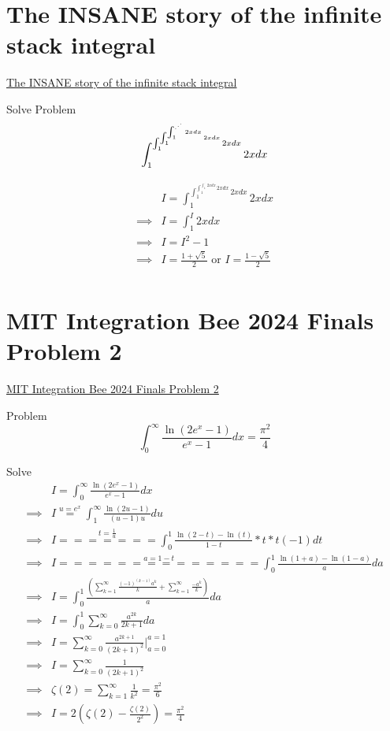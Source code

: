 \documentclass {article}
\begin{document}
\section{The INSANE story of the infinite stack integral}
\href{https://www.youtube.com/watch?v=R1ssF4iS3mk}{The INSANE story of the infinite stack integral}

Solve Problem
\[
\int_1^{\int_1^{\int_1^{\int_1^{.^{.^{.}}} 2x {d}x}2x {d}x}2x {d}x}2x {d}x \\
\]

\[
\begin{matrix}
 &    I = \int_1^{\int_1^{\int_1^{\int_1^{.^{.^{.}}} 2x {d}x}2x {d}x}2x {d}x}2x {d}x \\
 \implies & I = \int_1^{I} 2x{d}x \\
 \implies & I = I ^2 - 1 \\
 \implies & I = \frac {1 + \sqrt{5}} {2} \text { or } I = \frac {1 - \sqrt{5}} {2}  \\
\end{matrix}
\]

\section{MIT Integration Bee 2024 Finals Problem 2}
\href{https://www.youtube.com/watch?v=xdpKnkm2MT0}{MIT Integration Bee 2024 Finals Problem 2}



Problem  \[ \int_0^{\infty} \frac {\ln\left(2e^{x} - 1\right)} {e ^ {x} - 1} {d}x = \frac{\pi^2} {4}\]

Solve
\[
\begin{matrix}
        & I = \int_0^{\infty} \frac{\ln\left(2e^{x} - 1\right)} {e^{x}-1}{d}x \\
\implies & I \stackrel{u=e^{x}}{=} \int_1^{\infty} \frac{\ln\left(2u - 1\right)}{(u - 1)u} {d}u   \\
\implies & I \stackrel{t = \frac{1}{u}}{=======} \int_0^{1} \frac{\ln(2-t) - \ln(t)}{1-t} * t * t (-1) {d}t \\
\implies & I \stackrel {a = 1-t} {==============} \int_0^{1} \frac{\ln(1+a) - \ln(1-a)} {a} {d}a  \\
\implies & I = \int_0^1 \frac{\left({\displaystyle\sum_{k=1}^{\infty}\frac{(-1)^{(k-1)}a ^k}{k} + \displaystyle\sum_{k=1}^{\infty}\frac{-a^k}{k}} \right)}{a} {d}a \\
\implies & I = \int_0^1 \displaystyle\sum_{k=0}^{\infty} \frac{a^{2k}}{2k+1} {d}a \\
\implies & I = \displaystyle\sum_{k=0}^{\infty} \frac{a^{2k+1}}{(2k+1)^2} \Big|_{a=0}^{a=1} \\
\implies & I = \displaystyle\sum_{k=0}^{\infty} \frac{1} {(2k+1)^2} \\
\implies & \zeta(2) = \displaystyle\sum_{k=1}^{\infty}\frac{1}{k^2} = \frac{\pi^2}{6} \\
\implies & I = 2(\zeta(2) - \frac{\zeta(2)}{2^2}) = \frac{\pi^2}{4} \\
\end{matrix}
\]
\end{document}
